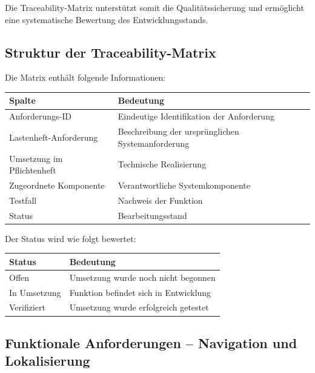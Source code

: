 \documentclass[
  a4paper,
  12pt,
  DIV=12,        %
  parskip=half,  %
  headings=small %
]{scrartcl}
\theoremstyle{definition}
\theoremstyle{definition}
\begin{document}
Die Traceability-Matrix unterstützt somit die Qualitätssicherung und
ermöglicht eine systematische Bewertung des Entwicklungsstands.

\subsection{Struktur der
Traceability-Matrix}\label{struktur-der-traceability-matrix}

Die Matrix enthält folgende Informationen:

\begin{longtable}[]{@{}
  >{\raggedright\arraybackslash}p{}
  >{\raggedright\arraybackslash}p{}@{}}
\toprule\noalign{}
\begin{minipage}[b]{\linewidth}\raggedright
Spalte
\end{minipage} & \begin{minipage}[b]{\linewidth}\raggedright
Bedeutung
\end{minipage} \\
\midrule\noalign{}
\endhead
\bottomrule\noalign{}
\endlastfoot
Anforderungs-ID & Eindeutige Identifikation der Anforderung \\
Lastenheft-Anforderung & Beschreibung der ursprünglichen
Systemanforderung \\
Umsetzung im Pflichtenheft & Technische Realisierung \\
Zugeordnete Komponente & Verantwortliche Systemkomponente \\
Testfall & Nachweis der Funktion \\
Status & Bearbeitungsstand \\
\end{longtable}

Der Status wird wie folgt bewertet:

\begin{longtable}[]{@{}ll@{}}
\toprule\noalign{}
Status & Bedeutung \\
\midrule\noalign{}
\endhead
\bottomrule\noalign{}
\endlastfoot
Offen & Umsetzung wurde noch nicht begonnen \\
In Umsetzung & Funktion befindet sich in Entwicklung \\
Verifiziert & Umsetzung wurde erfolgreich getestet \\
\end{longtable}

\subsection{Funktionale Anforderungen -- Navigation und
Lokalisierung}\label{funktionale-anforderungen-navigation-und-lokalisierung}
\end{document}
